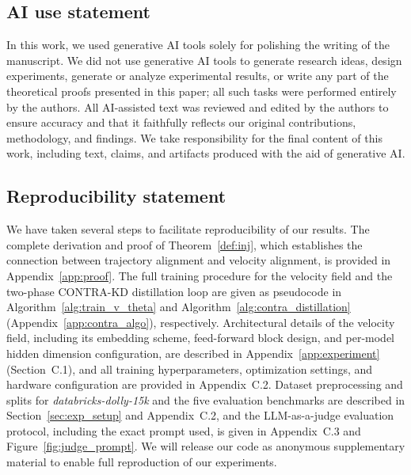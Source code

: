 \documentclass{article} %
\theoremstyle{definition}
\theoremstyle{remark}
\begin{document}


\subsection*{AI use statement}

In this work, we used generative AI tools solely for polishing the writing of the manuscript. We did not use generative AI tools to generate research ideas, design experiments, generate or analyze experimental results, or write any part of the theoretical proofs presented in this paper; all such tasks were performed entirely by the authors. All AI-assisted text was reviewed and edited by the authors to ensure accuracy and that it faithfully reflects our original contributions, methodology, and findings. We take responsibility for the final content of this work, including text, claims, and artifacts produced with the aid of generative AI.

\subsection*{Reproducibility statement}

We have taken several steps to facilitate reproducibility of our results. The complete derivation and proof of Theorem~\ref{def:inj}, which establishes the connection between trajectory alignment and velocity alignment, is provided in Appendix~\ref{app:proof}. The full training procedure for the velocity field and the two-phase CONTRA-KD distillation loop are given as pseudocode in Algorithm~\ref{alg:train_v_theta} and Algorithm~\ref{alg:contra_distillation} (Appendix~\ref{app:contra_algo}), respectively. Architectural details of the velocity field, including its embedding scheme, feed-forward block design, and per-model hidden dimension configuration, are described in Appendix~\ref{app:experiment} (Section~C.1), and all training hyperparameters, optimization settings, and hardware configuration are provided in Appendix~C.2. Dataset preprocessing and splits for \textit{databricks-dolly-15k} and the five evaluation benchmarks are described in Section~\ref{sec:exp_setup} and Appendix~C.2, and the LLM-as-a-judge evaluation protocol, including the exact prompt used, is given in Appendix~C.3 and Figure~\ref{fig:judge_prompt}. We will release our code as anonymous supplementary material to enable full reproduction of our experiments.
\end{document}

